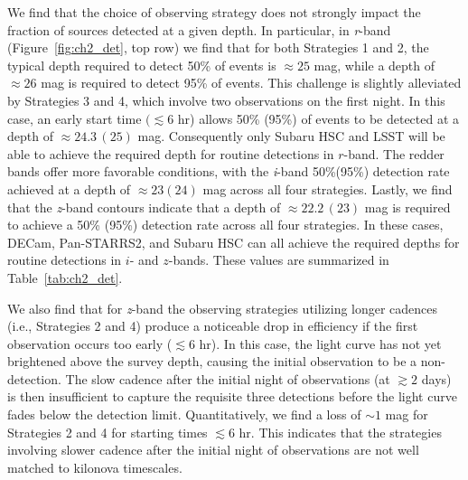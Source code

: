 We find that the choice of observing strategy does not strongly impact the fraction of sources detected at a given depth. In particular, in {\em r}-band (Figure~\ref{fig:ch2_det}, top row) we find that for both Strategies 1 and 2, the typical depth required to detect 50\% of events is $\approx25$ mag, while a depth of $\approx26$ mag is required to detect 95\% of events. This challenge is slightly alleviated by Strategies 3 and 4, which involve two observations on the first night. In this case, an early start time $(\lesssim 6$ hr) allows 50\% (95\%) of events to be detected at a depth of $\approx24.3\,(25)$ mag. Consequently only Subaru HSC and LSST will be able to achieve the required depth for routine detections in $r$-band. The redder bands offer more favorable conditions, with the {\em i}-band 50\%(95\%) detection rate achieved at a depth of $\approx 23(24)$ mag across all four strategies. Lastly, we find that the {\em z}-band contours indicate that a depth of $\approx22.2\,(23)$ mag is required to achieve a 50\% (95\%) detection rate across all four strategies. In these cases, DECam, Pan-STARRS2, and Subaru HSC can all achieve the required depths for routine detections in $i$- and $z$-bands.  These values are summarized in Table~\ref{tab:ch2_det}.

We also find that for {\em z}-band the observing strategies utilizing longer cadences (i.e., Strategies 2 and 4) produce a noticeable drop in efficiency if the first observation occurs too early ($\lesssim 6$ hr). In this case, the light curve has not yet brightened above the survey depth, causing the initial observation to be a non-detection. The slow cadence after the initial night of observations (at $\gtrsim2$ days) is then insufficient to capture the requisite three detections before the light curve fades below the detection limit. Quantitatively, we find a loss of $\sim 1$ mag for Strategies 2 and 4 for starting times $\lesssim 6$ hr. This indicates that the strategies involving slower cadence after the initial night of observations are not well matched to kilonova timescales.

